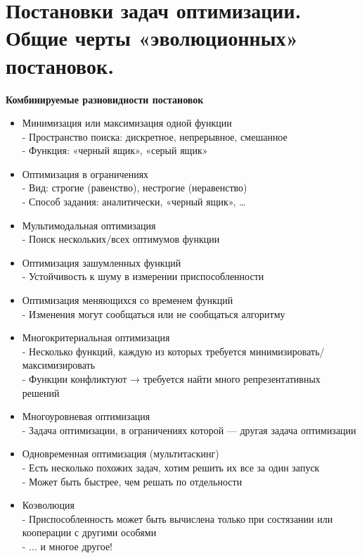 \section{Постановки задач оптимизации. Общие черты «эволюционных» постановок.}
\begin{center}
     \textbf{Комбинируемые разновидности постановок\\}
\end{center}
\begin{itemize}
\item Минимизация или максимизация одной функции\\
- Пространство поиска: дискретное, непрерывное, смешанное\\
- Функция: «черный ящик», «серый ящик»
\item Оптимизация в ограничениях\\
- Вид: строгие (равенство), нестрогие (неравенство)\\
- Способ задания: аналитически, «черный ящик», …
\item Мультимодальная оптимизация\\
- Поиск нескольких/всех оптимумов функции
\item Оптимизация зашумленных функций \\
- Устойчивость к шуму в измерении приспособленности
\item Оптимизация меняющихся со временем функций\\
- Изменения могут сообщаться или не сообщаться алгоритму
\item Многокритериальная оптимизация\\
- Несколько функций, каждую из которых требуется минимизировать/максимизировать\\
- Функции конфликтуют → требуется найти много репрезентативных решений
\item Многоуровневая оптимизация\\
- Задача оптимизации, в ограничениях которой — другая задача оптимизации
\item Одновременная оптимизация (мультитаскинг)\\
- Есть несколько похожих задач, хотим решить их все за один запуск\\
- Может быть быстрее, чем решать по отдельности
\item Коэволюция\\
- Приспособленность может быть вычислена только при состязании или кооперации с другими особями \\
- ... и многое другое!\\
\end{itemize}
